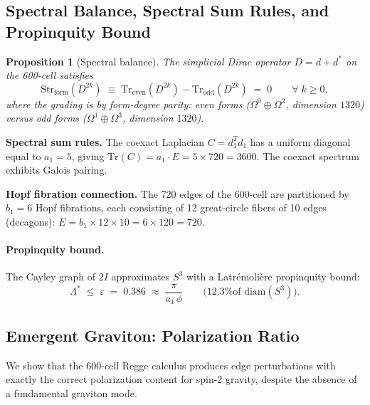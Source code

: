 \documentclass[12pt,a4paper]{article}
\newtheorem{proposition}{Proposition}
\theoremstyle{definition}
\begin{document}
\subsection{Spectral Balance, Spectral Sum Rules, and Propinquity Bound}

\begin{proposition}[Spectral balance]\label{prop:S-spectral-balance}
The simplicial Dirac operator $D = d + d^*$ on the 600-cell satisfies
\begin{equation}
\mathrm{Str}_{\mathrm{form}}(D^{2k}) \;\equiv\; \mathrm{Tr}_{\mathrm{even}}(D^{2k}) - \mathrm{Tr}_{\mathrm{odd}}(D^{2k}) \;=\; 0 \qquad \forall\; k \geq 0,
\end{equation}
where the grading is by form-degree parity: even forms ($\Omega^0 \oplus \Omega^2$, dimension $1320$) versus odd forms ($\Omega^1 \oplus \Omega^3$, dimension $1320$).
\end{proposition}

\textbf{Spectral sum rules.}  The coexact Laplacian $C = d_1^T d_1$ has a uniform diagonal equal to $a_1 = 5$, giving $\text{Tr}(C) = a_1 \cdot E = 5 \times 720 = 3600$.  The coexact spectrum exhibits Galois pairing.

\textbf{Hopf fibration connection.}  The 720 edges of the 600-cell are partitioned by $b_1 = 6$ Hopf fibrations, each consisting of 12 great-circle fibers of 10 edges (decagons):
$E = b_1 \times 12 \times 10 = 6 \times 120 = 720$.

\paragraph{Propinquity bound.}
The Cayley graph of $2I$ approximates $S^3$ with a Latr\'emoli\`ere propinquity bound:
\begin{equation}
\Lambda^* \;\leq\; \varepsilon \;=\; 0.386 \;\approx\; \frac{\pi}{a_1\,\phi} \qquad \text{(12.3\% of $\mathrm{diam}(S^3)$)}.
\end{equation}


\subsection{Emergent Graviton: Polarization Ratio}
\label{sec:S-graviton-ratio}

We show that the 600-cell Regge calculus produces edge perturbations with exactly the correct polarization content for spin-2 gravity, despite the absence of a fundamental graviton mode.
\end{document}
